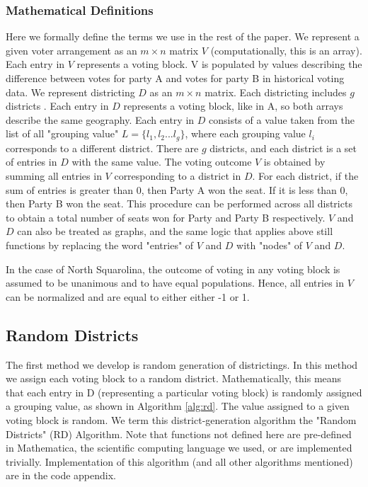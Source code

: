 \documentclass[12pt]{article}
\begin{document}
    \subsubsection{Mathematical Definitions}
    Here we formally define the terms we use in the rest of the paper. We represent a given voter arrangement as an \(m \times n\) matrix \(V\) (computationally, this is an array). Each entry in \(V\) represents a voting block. V is populated by values describing the difference between votes for party A and votes for party B in historical voting data. We represent districting \(D\) as an \(m \times n\) matrix. Each districting includes \(g\) districts . Each entry in \(D\) represents a voting block, like in A, so both arrays describe the same geography. Each entry in \(D\) consists of a value taken from the list of all "grouping value" \(L=\{l_1, l_2...l_g\}\), where each grouping value \(l_i\) corresponds to a different district. There are \(g\) districts, and each district is a set of entries in \(D\) with the same value.  The voting outcome \(V\) is obtained by summing all entries in $V$ corresponding to a district in \(D\). For each district, if the sum of entries is greater than 0, then Party A won the seat. If it is less than 0, then Party B won the seat. This procedure can be performed across all districts to obtain a total number of seats won for Party and Party B respectively. \(V\) and \(D\) can also be treated as graphs, and the same logic that applies above still functions by replacing the word "entries" of \(V\) and \(D\) with "nodes" of \(V\) and \(D\).
    \par
    In the case of North Squarolina, the outcome of voting in any voting block is assumed to be unanimous and to have equal populations. Hence, all entries in \(V\) can be normalized and are equal to either either -1 or 1.
\subsection{Random Districts}
    The first method we develop is random generation of districtings. In this method we assign each voting block to a random district. Mathematically, this means that each entry in D (representing a particular voting block) is randomly assigned a grouping value, as shown in Algorithm \ref{alg:rd}. The value assigned to a given voting block is random. We term this district-generation algorithm the "Random Districts" (RD) Algorithm. Note that functions not defined here are pre-defined in Mathematica, the scientific computing language we used, or are implemented trivially. Implementation of this algorithm (and all other algorithms mentioned) are in the code appendix. 
    
\end{document}
